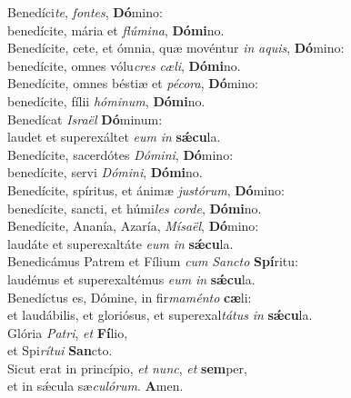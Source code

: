 \evenverse Benedíci\textit{te}, \textit{fon}\textit{tes}, \textbf{Dó}mino:~\*\\
\evenverse benedícite, mária et \textit{flú}\textit{mi}\textit{na}, \textbf{Dó}\textbf{mi}no.\\
\oddverse Benedícite, cete, et ómnia, quæ movéntur \textit{in} \textit{a}\textit{quis}, \textbf{Dó}mino:~\*\\
\oddverse benedícite, omnes vólu\textit{cres} \textit{cæ}\textit{li}, \textbf{Dó}\textbf{mi}no.\\
\evenverse Benedícite, omnes béstiæ et \textit{pé}\textit{co}\textit{ra}, \textbf{Dó}mino:~\*\\
\evenverse benedícite, fílii \textit{hó}\textit{mi}\textit{num}, \textbf{Dó}\textbf{mi}no.\\
\oddverse Benedícat \textit{Is}\textit{ra}\textit{ël} \textbf{Dó}minum:~\*\\
\oddverse laudet et superexáltet \textit{e}\textit{um} \textit{in} \textbf{sǽ}\textbf{cu}la.\\
\evenverse Benedícite, sacerdótes \textit{Dó}\textit{mi}\textit{ni}, \textbf{Dó}mino:~\*\\
\evenverse benedícite, servi \textit{Dó}\textit{mi}\textit{ni}, \textbf{Dó}\textbf{mi}no.\\
\oddverse Benedícite, spíritus, et ánimæ \textit{ju}\textit{stó}\textit{rum}, \textbf{Dó}mino:~\*\\
\oddverse benedícite, sancti, et húmi\textit{les} \textit{cor}\textit{de}, \textbf{Dó}\textbf{mi}no.\\
\evenverse Benedícite, Ananía, Azaría, \textit{Mí}\textit{sa}\textit{ël}, \textbf{Dó}mino:~\*\\
\evenverse laudáte et superexaltáte \textit{e}\textit{um} \textit{in} \textbf{sǽ}\textbf{cu}la.\\
\oddverse Benedicámus Patrem et Fílium \textit{cum} \textit{San}\textit{cto} \textbf{Spí}ritu:~\*\\
\oddverse laudémus et superexaltémus \textit{e}\textit{um} \textit{in} \textbf{sǽ}\textbf{cu}la.\\
\evenverse Benedíctus es, Dómine, in fir\textit{ma}\textit{mén}\textit{to} \textbf{cæ}li:~\*\\
\evenverse et laudábilis, et gloriósus, et superexal\textit{tá}\textit{tus} \textit{in} \textbf{sǽ}\textbf{cu}la.\\
\oddverse Glória \textit{Pa}\textit{tri}, \textit{et} \textbf{Fí}lio,~\*\\
\oddverse et Spi\textit{rí}\textit{tu}\textit{i} \textbf{San}cto.\\
\evenverse Sicut erat in princípio, \textit{et} \textit{nunc}, \textit{et} \textbf{sem}per,~\*\\
\evenverse et in sǽcula sæ\textit{cu}\textit{ló}\textit{rum}. \textbf{A}men.\\
